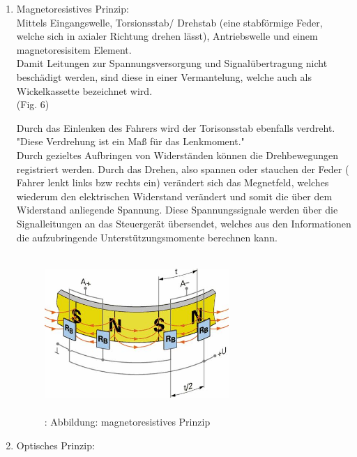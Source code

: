 				\begin{enumerate}
					\item Magnetoresistives Prinzip:\\
					
							 Mittels Eingangswelle, Torsionsstab/ Drehstab (eine stabförmige Feder, welche sich in axialer Richtung drehen lässt), Antriebswelle und einem magnetoresisitem Element. \\
							 Damit Leitungen zur Spannungsversorgung und Signalübertragung nicht beschädigt werden, sind diese in einer Vermantelung, welche auch als Wickelkassette bezeichnet wird.\\ (Fig. 6)
							 
							 Durch das Einlenken des Fahrers wird der Torisonsstab ebenfalls verdreht. "Diese Verdrehung ist ein Maß für das Lenkmoment."\cite{TS_dreh}\\
							 Durch gezieltes Aufbringen von Widerständen können die Drehbewegungen registriert werden. Durch das Drehen, also spannen oder stauchen der Feder ( Fahrer lenkt links bzw rechts ein) verändert sich das Megnetfeld, welches wiederum den elektrischen Widerstand verändert und somit die über dem Widerstand anliegende Spannung. Diese Spannungssignale werden über die Signalleitungen an das Steuergerät übersendet, welches aus den Informationen die aufzubringende Unterstützungsmomente berechnen kann.				 

							\begin{figure}
								\centering
								\includegraphics[width=7cm, height=6cm] {lenkdrehmomentsensor.png}
								\caption {\cite{TS_dreh_pic_mag}: Abbildung: magnetoresistives Prinzip}
							\end{figure}			 

	
					\item Optisches Prinzip:


\end{enumerate}
